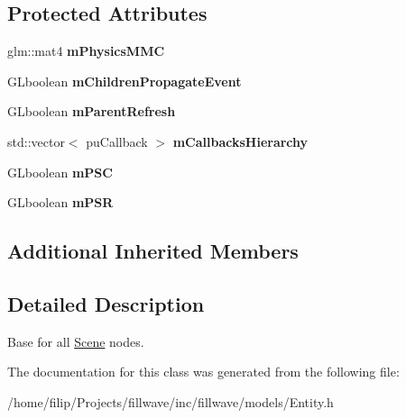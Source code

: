 \subsection*{Protected Attributes}
\begin{DoxyCompactItemize}
\item 
glm\+::mat4 {\bfseries m\+Physics\+M\+MC}\hypertarget{classflw_1_1flf_1_1Entity_aef9e641dc79bc9dccca0ce13e618ce68}{}\label{classflw_1_1flf_1_1Entity_aef9e641dc79bc9dccca0ce13e618ce68}

\item 
G\+Lboolean {\bfseries m\+Children\+Propagate\+Event}\hypertarget{classflw_1_1flf_1_1Entity_a4a1f8bd96ef1ab91cbcfd146497b7fc3}{}\label{classflw_1_1flf_1_1Entity_a4a1f8bd96ef1ab91cbcfd146497b7fc3}

\item 
G\+Lboolean {\bfseries m\+Parent\+Refresh}\hypertarget{classflw_1_1flf_1_1Entity_aabd5eef30310557a0c7e4d2dbde8b8b1}{}\label{classflw_1_1flf_1_1Entity_aabd5eef30310557a0c7e4d2dbde8b8b1}

\item 
std\+::vector$<$ pu\+Callback $>$ {\bfseries m\+Callbacks\+Hierarchy}\hypertarget{classflw_1_1flf_1_1Entity_a618cff5fcfef2a5f9cae008e7636d9ad}{}\label{classflw_1_1flf_1_1Entity_a618cff5fcfef2a5f9cae008e7636d9ad}

\item 
G\+Lboolean {\bfseries m\+P\+SC}\hypertarget{classflw_1_1flf_1_1Entity_a40c5087118a9ae947f3545833f055801}{}\label{classflw_1_1flf_1_1Entity_a40c5087118a9ae947f3545833f055801}

\item 
G\+Lboolean {\bfseries m\+P\+SR}\hypertarget{classflw_1_1flf_1_1Entity_a459cd19058216cdce6956526db9db0f4}{}\label{classflw_1_1flf_1_1Entity_a459cd19058216cdce6956526db9db0f4}

\end{DoxyCompactItemize}
\subsection*{Additional Inherited Members}


\subsection{Detailed Description}
Base for all \hyperlink{classflw_1_1flf_1_1Scene}{Scene} nodes. 

The documentation for this class was generated from the following file\+:\begin{DoxyCompactItemize}
\item 
/home/filip/\+Projects/fillwave/inc/fillwave/models/Entity.\+h\end{DoxyCompactItemize}
